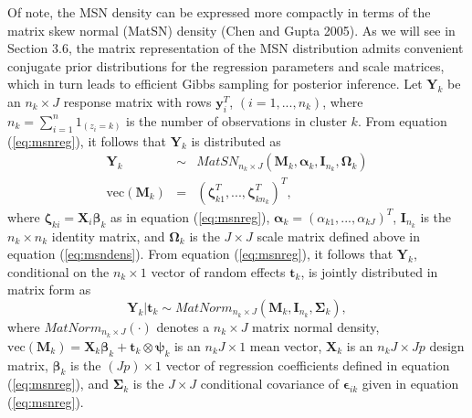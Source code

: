 \documentclass[useAMS,referee]{biom}
\begin{document}
Of note, the MSN density can be expressed more compactly in terms of the matrix skew normal (MatSN) density (Chen and Gupta 2005). As we will see in Section 3.6, the matrix representation of the MSN distribution admits convenient conjugate prior distributions for the regression parameters and scale matrices, which in turn leads to efficient Gibbs sampling for posterior inference. Let $\mathbf{Y}_k$ be an ${n_k \times J}$ response matrix with rows $\mathbf{y}_i^T$, $(i = 1,...,n_k)$, where $n_k = \sum_{i = 1}^n {1}_{(z_i = k)}$ is the number of observations in cluster $k$. From equation (\ref{eq:msnreg}), it follows that $\mathbf{Y}_k$ is distributed as
\begin{eqnarray*}
\mathbf{Y}_{k} &\sim& MatSN_{n_k \times J}(\mathbf{M}_k,\boldsymbol\alpha_k,\mathbf{I}_{n_k},\boldsymbol\Omega_k)\\
\text{vec}(\mathbf{M}_k) &=& (\boldsymbol\zeta_{k1}^T,...,\boldsymbol\zeta_{kn_k}^T)^T,
\end{eqnarray*}
where $\boldsymbol\zeta_{ki} = \mathbf{X}_i \boldsymbol\beta_k$ as in equation (\ref{eq:msnreg}), $\boldsymbol\alpha_k = (\alpha_{k1},...,\alpha_{kJ})^T$, $\mathbf{I}_{n_k}$ is the $n_k\times n_k$ identity matrix, and $\boldsymbol\Omega_k$ is the $J\times J$ scale matrix defined above in equation (\ref{eq:msndens}). From equation (\ref{eq:msnreg}), it follows that $\mathbf{Y}_{k}$, conditional on the $n_k\times 1$ vector of random effects $\mathbf{t}_{k}$, is jointly distributed in matrix form as
\[
\mathbf{Y}_k | \mathbf{t}_k \sim MatNorm_{n_k \times J}(\mathbf{M}_k, \mathbf{I}_{n_k}, \boldsymbol\Sigma_k),
\]
where $MatNorm_{n_k \times J}(\cdot)$ denotes a $n_k\times J$ matrix normal density, $\text{vec}(\mathbf{M}_k) = \mathbf{X}_{k} \boldsymbol\beta_k + \mathbf{t}_k \otimes \boldsymbol\psi_k$ is an $n_kJ\times 1$ mean vector, $\mathbf{X}_k$ is an $n_kJ \times Jp$ design matrix, $\boldsymbol\beta_k$ is the $(Jp)\times 1$ vector of regression coefficients defined in equation (\ref{eq:msnreg}), and $\boldsymbol\Sigma_k$ is the $J\times J$ conditional covariance of $\boldsymbol\epsilon_{ik}$ given in equation (\ref{eq:msnreg}).
\end{document}
